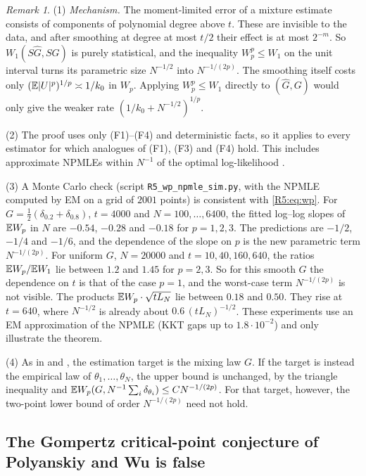 \documentclass[11pt]{amsart}
\theoremstyle{definition}
\theoremstyle{remark}
\newtheorem{remark}[theorem]{Remark}
\begin{document}
\begin{remark}\label{R5:rem:wp}
(1) \emph{Mechanism.}  The moment-limited error of a mixture estimate
consists of components of polynomial degree above $t$.  These are
invisible to the data, and after smoothing at degree at most $t/2$ their
effect is at most $2^{-m}$.  So
$W_1(S\widehat G,SG)$ is purely statistical, and the inequality
$W_p^p\le W_1$ on the unit interval turns its parametric size $N^{-1/2}$
into $N^{-1/(2p)}$.  The smoothing itself costs only
$(\mathbb{E}|U|^p)^{1/p}\asymp1/k_0$ in $W_p$.  Applying $W_p^p\le W_1$ directly
to $(\widehat G,G)$ would only give the weaker rate
$(1/k_0+N^{-1/2})^{1/p}$.

(2) The proof uses only (F1)--(F4) and deterministic facts, so it applies
to every estimator for which analogues of (F1), (F3) and (F4) hold.  This
includes approximate NPMLEs within $N^{-1}$ of the optimal log-likelihood
\cite[Part~VI]{K-029}.

(3) A Monte Carlo check (script \texttt{R5\_\allowbreak{}wp\_\allowbreak{}npmle\_\allowbreak{}sim.py}, with the
NPMLE computed by EM on a grid of $2001$ points) is consistent with
\eqref{R5:eq:wp}.  For $G=\frac12(\delta_{0.2}+\delta_{0.8})$, $t=4000$ and
$N=100,\dots,6400$, the fitted log--log slopes of $\mathbb{E} W_p$ in $N$ are
$-0.54$, $-0.28$ and $-0.18$ for $p=1,2,3$.  The predictions are $-1/2$,
$-1/4$ and $-1/6$, and the dependence of the slope on $p$ is the new
parametric term $N^{-1/(2p)}$.  For uniform $G$, $N=20000$ and
$t=10,40,160,640$, the ratios $\mathbb{E} W_p/\mathbb{E} W_1$ lie between $1.2$ and
$1.45$ for $p=2,3$.  So for this smooth $G$ the dependence on $t$ is that
of the case $p=1$, and the worst-case term $N^{-1/(2p)}$ is not visible.
The products $\mathbb{E} W_p\cdot\sqrt{tL_N}$ lie between $0.18$ and $0.50$.
They rise at $t=640$, where $N^{-1/2}$ is already about
$0.6\,(tL_N)^{-1/2}$.  These experiments use an EM approximation of the
NPMLE (KKT gaps up to $1.8\cdot10^{-2}$) and only illustrate the theorem.

(4) As in \cite{R5-VKVK19} and \cite{K-029}, the estimation target is the
mixing law $G$.  If the target is instead the empirical law of
$\theta_1,\dots,\theta_N$, the upper bound is unchanged, by the triangle
inequality and $\mathbb{E} W_p(G,N^{-1}\sum_i\delta_{\theta_i})\le CN^{-1/(2p)}$.
For that target, however, the two-point lower bound of order $N^{-1/(2p)}$
need not hold.
\end{remark}

\subsection{The Gompertz critical-point conjecture of Polyanskiy and Wu is false}
\label{R5:sec:gompertz}
\end{document}
